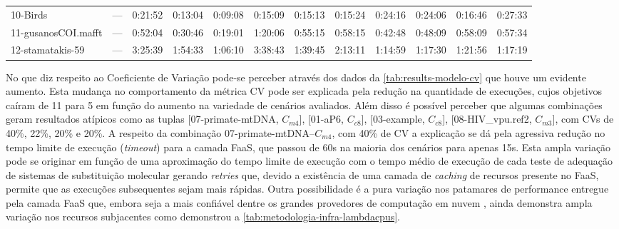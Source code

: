 \documentclass[english,brazilian]{UNISINOSmonografia} %
\begin{document}
{\begin{landscape}
\begin{table}[tbp]
\begin{minipage}{\linewidth}
\begin{tabularx}{\textwidth}{@{\extracolsep{\fill}}lWWWWWWWWWWW@{}}
					10-Birds & --- & 0:21:52 & 0:13:04 & 0:09:08 & 0:15:09 & 0:15:13 & 0:15:24 & 0:24:16 & 0:24:06 & 0:16:46 & 0:27:33 \\
					11-gusanosCOI.mafft & --- & 0:52:04 & 0:30:46 & 0:19:01 & 1:20:06 & 0:55:15 & 0:58:15 & 0:42:48 & 0:48:09 & 0:58:09 & 0:57:34 \\
					12-stamatakis-59 & --- & 3:25:39 & 1:54:33 & 1:06:10 & 3:38:43 & 1:39:45 & 2:13:11 & 1:14:59 & 1:17:30 & 1:21:56 & 1:17:19 \\ 
					\bottomrule
				\end{tabularx}
			\end{minipage}
		\end{table}
	\end{landscape}
}



No que diz respeito ao Coeficiente de Variação pode-se perceber através dos dados da \autoref{tab:results-modelo-cv} que houve um evidente aumento.
%
Esta mudança no comportamento da métrica CV pode ser explicada pela redução na quantidade de execuções, cujos objetivos caíram de 11 para 5 em função do aumento na variedade de cenários avaliados.
%
Além disso é possível perceber que algumas combinações geram resultados atípicos como as tuplas [07-primate-mtDNA, $C_{m4}$], [01-aP6, $C_{c8}$], [03-example, $C_{c8}$], [08-HIV\_vpu.ref2, $C_{m3}$], com CVs de 40\%, 22\%, 20\% e 20\%.
%
A respeito da combinação 07-primate-mtDNA--$C_{m4}$, com 40\% de CV a explicação se dá pela agressiva redução no tempo limite de execução (\textit{timeout}) para a camada FaaS, que passou de 60s na maioria dos cenários para apenas 15s.
%
Esta ampla variação pode se originar em função de uma aproximação do tempo limite de execução com o tempo médio de execução de cada teste de adequação de sistemas de substituição molecular gerando \textit{retries} que, devido a existência de uma camada de \textit{caching} de recursos presente no FaaS, permite que as execuções subsequentes sejam mais rápidas.
%
Outra possibilidade é a pura variação nos patamares de performance entregue pela camada FaaS que, embora seja a mais confiável dentre os grandes provedores de computação em nuvem \cite{Wang2018}, ainda demonstra ampla variação nos recursos subjacentes como demonstrou a \autoref{tab:metodologia-infra-lambdacpus}.
\end{document}
